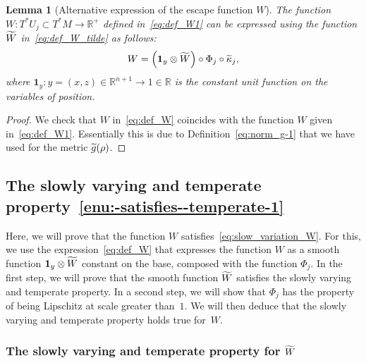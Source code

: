 \documentclass[10pt]{amsart}
\newtheorem{lemm}[theo]{Lemma}\newtheorem{prop}[theo]{Proposition}\newtheorem{coro}[theo]{Corollary}\newtheorem{conj}[theo]{Conjecture}
\theoremstyle{definition}\newtheorem{defi}[theo]{Definition}\newtheorem{rema}[theo]{Remark}\newtheorem{exam}[theo]{Example}\newtheorem{exem}[theo]{Example}\newtheorem{nota}[theo]{Notation}
\newcommand{\bbR}{\mathbb{R}}
\let\oldtilde\tilde
\renewcommand*{\tilde}[1]{\mathchoice{\widetilde{#1}}{\widetilde{#1}}{\oldtilde{#1}}{\oldtilde{#1}}}
\begin{document}

\begin{cBoxB}{}
\begin{lemm}[Alternative expression of the escape function $W$]
The function $W:T^{*}U_{j}\subset T^{*}M\rightarrow\bbR^{+}$ defined in~\eqref{eq:def_W1} can be expressed using the function $\tilde{W}$ in~\eqref{eq:def_W_tilde} as follows:
\begin{equation}\label{eq:def_W}
W=\left(\boldsymbol{1}_{y}\otimes\tilde{W}\right)\circ\Phi_{j}\circ\tilde{\kappa}_{j},
\end{equation}
where $\boldsymbol{1}_{y}:y=(x,z)\in\bbR^{n+1}\rightarrow1\in\bbR$ is the constant unit function on the variables of position.
\end{lemm}
\end{cBoxB}

\begin{proof}
We check that $W$ in~\eqref{eq:def_W} coincides with the function $W$ given in~\eqref{eq:def_W1}. Essentially this is due to Definition~\eqref{eq:norm_g-1} that we have used for the metric $\tilde{g}(\rho)$.
\end{proof}

\subsection{The slowly varying and temperate property~\eqref{enu:-satisfies--temperate-1}}

Here, we will prove that the function $W$ satisfies~\eqref{eq:slow_variation_W}. For this, we use the expression~\eqref{eq:def_W} that expresses the function $W$ as a smooth function $\boldsymbol{1}_{y}\otimes\tilde{W}$ constant on the base, composed with the function $\Phi_{j}$. In the first step, we will prove that the smooth function $\tilde{W}$ satisfies the slowly varying and temperate property. In a second step, we will show that $\Phi_{j}$ has the property of being Lipschitz at scale greater than~$1$. We will then deduce that the slowly varying and temperate property holds true for~$W$.

\subsubsection{The slowly varying and temperate property for \texorpdfstring{$\tilde{W}$}{W}}
\end{document}

